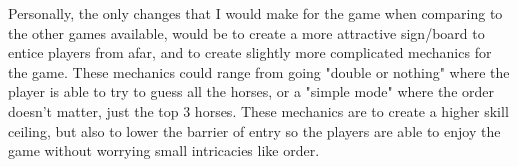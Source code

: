 \documentclass{article}
\begin{document}
{{\vspace{2ex}

Personally, the only changes that I would make for the game when comparing to the other games available, would be to create a more attractive sign/board to entice players from afar, and to create slightly more complicated mechanics for the game. These mechanics could range from going "double or nothing" where the player is able to try to guess all the horses, or a "simple mode" where the order doesn't matter, just the top 3 horses. These mechanics are to create a higher skill ceiling, but also to lower the barrier of entry so the players are able to enjoy the game without worrying small intricacies like order. 


}

}
\end{document}
